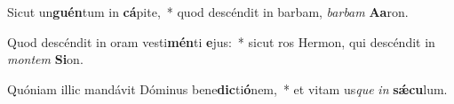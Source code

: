 \item Sicut un\textbf{guén}tum in \textbf{cá}pite,~* quod descéndit in barbam, \textit{bar}\textit{bam} \textbf{A}\textbf{a}ron.
\item Quod descéndit in oram vesti\textbf{mén}ti \textbf{e}jus:~* sicut ros Hermon, qui descéndit in \textit{mon}\textit{tem} \textbf{Si}on.
\item Quóniam illic mandávit Dóminus bene\textbf{dic}ti\textbf{ó}nem,~* et vitam us\textit{que} \textit{in} \textbf{sǽ}\textbf{cu}lum.
